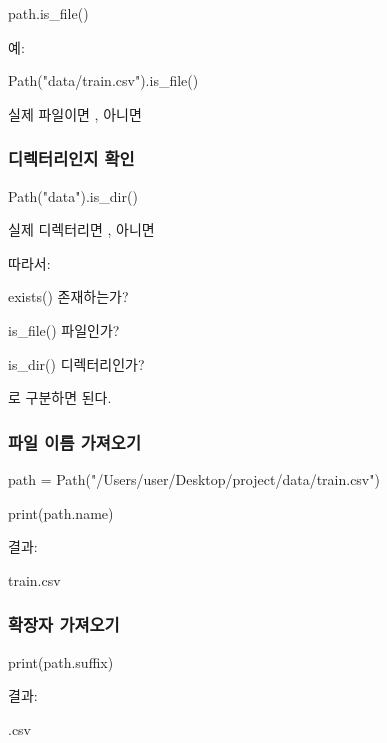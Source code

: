 \begin{dhkcode}
path.is_file()
\end{dhkcode}

예:

\begin{dhkcode}
Path("data/train.csv").is_file()
\end{dhkcode}

실제 파일이면 , 아니면 

\subsubsection{디렉터리인지 확인}

\begin{dhkcode}
Path("data").is_dir()
\end{dhkcode}

실제 디렉터리면 , 아니면 

따라서:

\begin{dhksmry}[centered]
exists()
\ra 존재하는가?

is_file()
\ra 파일인가?

is_dir()
\ra 디렉터리인가?
\end{dhksmry}

로 구분하면 된다.

\subsubsection{파일 이름 가져오기}

\begin{dhkcode}
path = Path("/Users/user/Desktop/project/data/train.csv")

print(path.name)
\end{dhkcode}

결과:

\begin{dhkzsh}
train.csv
\end{dhkzsh}

\subsubsection{확장자 가져오기}

\begin{dhkcode}
print(path.suffix)
\end{dhkcode}

결과:

\begin{dhkzsh}
.csv
\end{dhkzsh}

